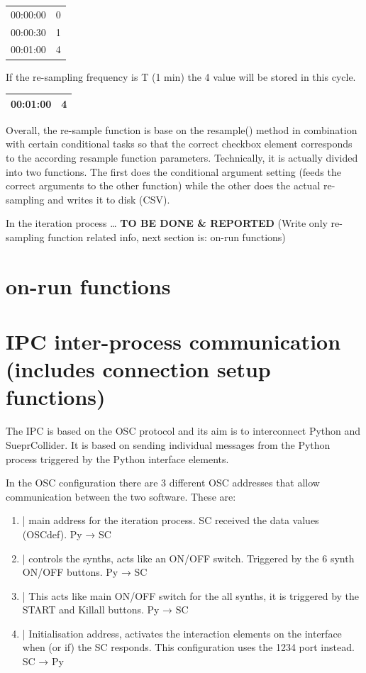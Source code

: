\documentclass[11pt]{article}
\begin{document}
\begin{center}
\begin{tabular}{rr}
\hline
00:00:00 & 0\\
00:00:30 & 1\\
00:01:00 & 4\\
\hline
\end{tabular}
\end{center}

If the re-sampling frequency is T (1 min) the 4 value will be stored in this cycle.

\begin{center}
\begin{tabular}{rr}
\hline
00:01:00 & 4\\
\hline
\end{tabular}
\end{center}

Overall, the re-sample function is base on the resample() method in combination with certain conditional tasks so that the correct checkbox element corresponds to the according resample function parameters.  Technically, it is actually divided into two functions.  The first does the conditional argument setting (feeds the correct arguments to the other function) while the other does the actual re-sampling and writes it to disk (CSV).

In the iteration process \ldots{} \textbf{TO BE DONE \& REPORTED}  (Write only re-sampling function related info, next section is: on-run functions)

\section{on-run functions}
\label{sec:org88e769c}
\section{IPC inter-process communication (includes connection setup functions)}
\label{sec:org2551887}
The IPC is based on the OSC protocol and its aim is to interconnect Python and SueprCollider.  It is based on sending individual messages from the Python process triggered by the Python interface elements.

In the OSC configuration there are 3 different OSC addresses that allow communication between the two software.  These are:
\begin{enumerate}
\item \label{orgc94bf97} | main address for the iteration process.  SC received the data values (OSCdef).  Py → SC
\item \label{org3a1e138} | controls the synths, acts like an ON/OFF switch.  Triggered by the 6 synth ON/OFF buttons. Py → SC
\item \label{orgf2de1d5} | This acts like main ON/OFF switch for the all synths, it is triggered by the START and Killall buttons. Py → SC
\item \label{orgc295802} | Initialisation address, activates the interaction elements on the interface when (or if) the SC responds.  This configuration uses the 1234 port instead. SC → Py
\end{enumerate}
\end{document}
